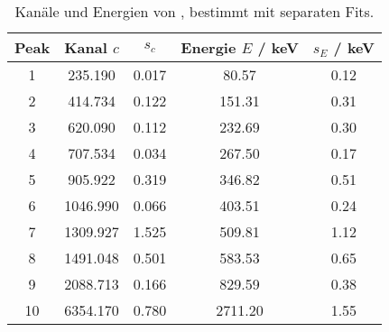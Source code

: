 \begin{table}[H]
\caption{Kan\"ale und Energien von \th, bestimmt mit separaten Fits.}
\begin{center}
\begin{tabular}{|c|c|c|c|c|}
  \hline
  Peak & Kanal $c$ & $s_c$ & Energie $E$ / keV & $s_E$ / keV \\ \hline
   1 & 235.190 & 0.017 & 80.57 & 0.12 \\ \hline
   2 & 414.734 & 0.122 & 151.31 & 0.31 \\ \hline
   3 & 620.090 & 0.112 & 232.69 & 0.30 \\ \hline
   4 & 707.534 & 0.034 & 267.50 & 0.17 \\ \hline
   5 & 905.922 & 0.319 & 346.82 & 0.51 \\ \hline
   6 & 1046.990 & 0.066 & 403.51 & 0.24 \\ \hline
   7 & 1309.927 & 1.525 & 509.81 & 1.12 \\ \hline
   8 & 1491.048 & 0.501 & 583.53 & 0.65 \\ \hline
   9 & 2088.713 & 0.166 & 829.59 & 0.38 \\ \hline
   10 & 6354.170 & 0.780 & 2711.20 & 1.55 \\ \hline
\end{tabular}
\end{center}
\label{tab:th:single}
\end{table}
